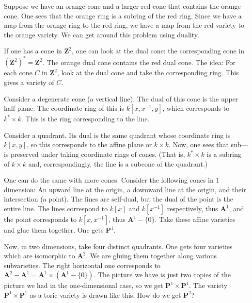 \documentclass [11 pt, oneside, margin = 1 in] {article}
\begin{document}
\begin{example}
Suppose we have an orange cone and a larger red cone that contains the orange cone. One sees that the orange ring is a subring of the red ring. Since we have a map from the orange ring to the red ring, we have a map from the red variety to the orange variety. We can get around this problem using duality. 

If one has a cone in $\mathbf{Z}^2$, one can look at the dual cone: the corresponding cone in $(\mathbf{Z}^2)^*=\mathbf{Z}^2$. The orange dual cone contains the red dual cone. The idea: For each cone $C$ in $\mathbf{Z}^2$, look at the dual cone and take the corresponding ring. This gives a variety of $C$.

Consider a degenerate cone (a vertical line). The dual of this cone is the upper half plane. The coordinate ring of this is $k[x,x^{-1},y]$, which corresponds to $k^*\times k$. This is the ring corresponding to the line.

Consider a quadrant. Its dual is the same quadrant whose coordinate ring is $k[x,y]$, so this corresponds to the affine plane or $k\times k$. Now, one sees that sub--- is preserved under taking coordinate rings of cones. (That is, $k^*\times k$ is a subring of $k\times k$ and, correspondingly, the line is a subcone of the quadrant.)
\end{example}

		One can do the same with more cones. Consider the following cones in $1$ dimension: An upward line at the origin, a downward line at the origin, and their intersection (a point). The lines are self-dual, but the dual of the point is the entire line. The lines correspond to $k[x]$ and $k[x^{-1}]$ respectively, thus $\mathbf{A}^1$, and the point corresponds to $k[x,x^{-1}]$, thus $\mathbf{A}^1 - \{0\}$. Take these affine varieties and glue them together. One gets $\mathbf{P}^1$. 


Now, in two dimensions, take four distinct quadrants. One gets four varieties which are isomorphic to $\mathbf{A}^2$. We are gluing them together along various subvarieties. The right horizontal one corresponds to $\mathbf{A}^2 - \mathbf{A}^1 = \mathbf{A}^1 \times (\mathbf{A}^1 - \{0\})$. The picture we have is just two copies of the picture we had in the one-dimensional case, so we get $\mathbf{P}^1\times \mathbf{P}^1$. The variety $\mathbf{P}^1 \times \mathbf{P}^1$ as a toric variety is drawn like this. How do we get $\mathbf{P}^2$?
\end{document}
